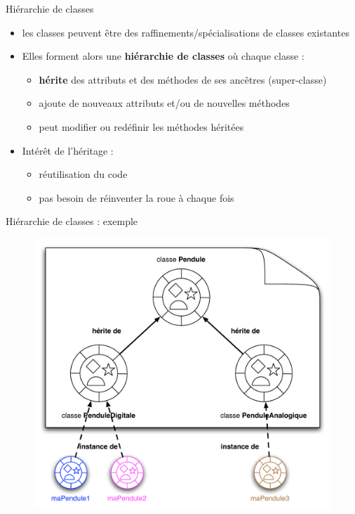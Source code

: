 \begin{frame}{Hiérarchie de classes}
\begin{itemize}
	\item les classes peuvent être des raffinements/spécialisations de classes existantes
	\item Elles forment alors une \textbf{hiérarchie de classes} où chaque classe :
	\begin{itemize}
		\item \textbf{hérite} des attributs et des méthodes de ses ancêtres (super-classe)
		\item ajoute de nouveaux attributs et/ou de nouvelles méthodes
		\item peut modifier ou redéfinir les méthodes héritées
	\end{itemize}
	\item Intérêt de l'héritage :
	\begin{itemize}
		\item réutilisation du code
		\item pas besoin de réinventer la roue à chaque fois
	\end{itemize}
\end{itemize}
\end{frame}

\begin{frame}{Hiérarchie de classes : exemple}
  \begin{figure}[htbp]
    \begin{center}
      \includegraphics[scale=.32]{fig/heritage.pdf}
    \end{center}
  \end{figure}
\end{frame}

